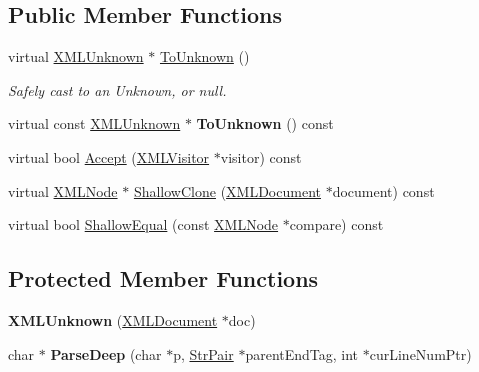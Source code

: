 \subsection*{Public Member Functions}
\begin{DoxyCompactItemize}
\item 
virtual \hyperlink{classtinyxml2_1_1XMLUnknown}{X\+M\+L\+Unknown} $\ast$ \hyperlink{classtinyxml2_1_1XMLUnknown_af4374856421921cad578c8affae872b6}{To\+Unknown} ()\hypertarget{classtinyxml2_1_1XMLUnknown_af4374856421921cad578c8affae872b6}{}\label{classtinyxml2_1_1XMLUnknown_af4374856421921cad578c8affae872b6}

\begin{DoxyCompactList}\small\item\em Safely cast to an Unknown, or null. \end{DoxyCompactList}\item 
virtual const \hyperlink{classtinyxml2_1_1XMLUnknown}{X\+M\+L\+Unknown} $\ast$ {\bfseries To\+Unknown} () const \hypertarget{classtinyxml2_1_1XMLUnknown_a257987e79955399e6e9f119b58d4bb30}{}\label{classtinyxml2_1_1XMLUnknown_a257987e79955399e6e9f119b58d4bb30}

\item 
virtual bool \hyperlink{classtinyxml2_1_1XMLUnknown_a0d341ab804a1438a474810bb5bd29dd5}{Accept} (\hyperlink{classtinyxml2_1_1XMLVisitor}{X\+M\+L\+Visitor} $\ast$visitor) const 
\item 
virtual \hyperlink{classtinyxml2_1_1XMLNode}{X\+M\+L\+Node} $\ast$ \hyperlink{classtinyxml2_1_1XMLUnknown_aa09fc7cb0cd64d6bb9c5ae00ffc549ec}{Shallow\+Clone} (\hyperlink{classtinyxml2_1_1XMLDocument}{X\+M\+L\+Document} $\ast$document) const 
\item 
virtual bool \hyperlink{classtinyxml2_1_1XMLUnknown_a0169df157bf69a092b404ca49621ff1a}{Shallow\+Equal} (const \hyperlink{classtinyxml2_1_1XMLNode}{X\+M\+L\+Node} $\ast$compare) const 
\end{DoxyCompactItemize}
\subsection*{Protected Member Functions}
\begin{DoxyCompactItemize}
\item 
{\bfseries X\+M\+L\+Unknown} (\hyperlink{classtinyxml2_1_1XMLDocument}{X\+M\+L\+Document} $\ast$doc)\hypertarget{classtinyxml2_1_1XMLUnknown_a9391eb679598d50baba424e6f1aa367b}{}\label{classtinyxml2_1_1XMLUnknown_a9391eb679598d50baba424e6f1aa367b}

\item 
char $\ast$ {\bfseries Parse\+Deep} (char $\ast$p, \hyperlink{classtinyxml2_1_1StrPair}{Str\+Pair} $\ast$parent\+End\+Tag, int $\ast$cur\+Line\+Num\+Ptr)\hypertarget{classtinyxml2_1_1XMLUnknown_aefc332cc1e6e25736f364d1e5eeb31fe}{}\label{classtinyxml2_1_1XMLUnknown_aefc332cc1e6e25736f364d1e5eeb31fe}

\end{DoxyCompactItemize}
